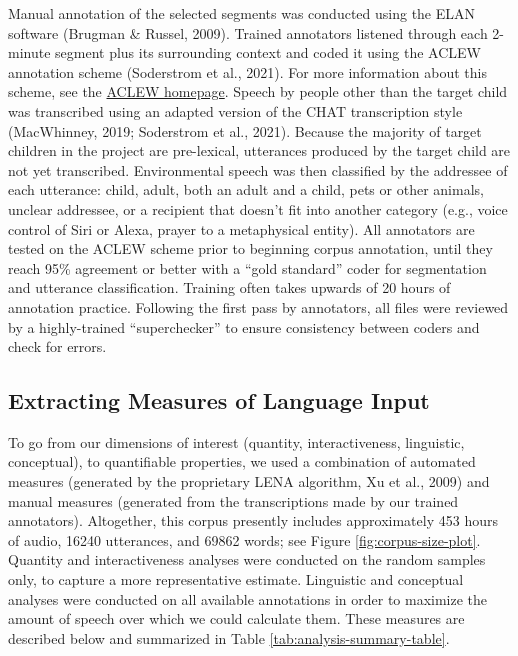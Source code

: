 \documentclass[
  man]{apa6}
\begin{document}
Manual annotation of the selected segments was conducted using the ELAN software (Brugman \& Russel, 2009). Trained annotators listened through each 2-minute segment plus its surrounding context and coded it using the ACLEW annotation scheme (Soderstrom et al., 2021). For more information about this scheme, see the \href{https://sites.google.com/view/aclewdid/home}{ACLEW homepage}. Speech by people other than the target child was transcribed using an adapted version of the CHAT transcription style (MacWhinney, 2019; Soderstrom et al., 2021). Because the majority of target children in the project are pre-lexical, utterances produced by the target child are not yet transcribed. Environmental speech was then classified by the addressee of each utterance: child, adult, both an adult and a child, pets or other animals, unclear addressee, or a recipient that doesn't fit into another category (e.g., voice control of Siri or Alexa, prayer to a metaphysical entity). All annotators are tested on the ACLEW scheme prior to beginning corpus annotation, until they reach 95\% agreement or better with a ``gold standard'' coder for segmentation and utterance classification. Training often takes upwards of 20 hours of annotation practice. Following the first pass by annotators, all files were reviewed by a highly-trained ``superchecker'' to ensure consistency between coders and check for errors.

\hypertarget{extracting-measures-of-language-input}{%
\subsection{Extracting Measures of Language Input}\label{extracting-measures-of-language-input}}

To go from our dimensions of interest (quantity, interactiveness, linguistic, conceptual), to quantifiable properties, we used a combination of automated measures (generated by the proprietary LENA algorithm, Xu et al., 2009) and manual measures (generated from the transcriptions made by our trained annotators). Altogether, this corpus presently includes approximately 453 hours of audio, 16240 utterances, and 69862 words; see Figure \ref{fig:corpus-size-plot}. Quantity and interactiveness analyses were conducted on the random samples only, to capture a more representative estimate. Linguistic and conceptual analyses were conducted on all available annotations in order to maximize the amount of speech over which we could calculate them. These measures are described below and summarized in Table \ref{tab:analysis-summary-table}.
\end{document}
